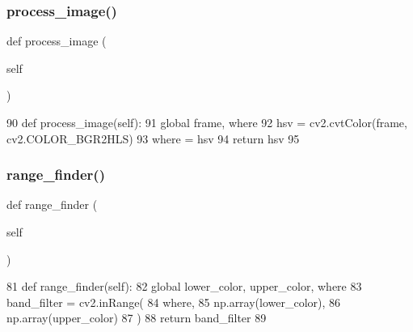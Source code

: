 \subsubsection{\texorpdfstring{process\+\_\+image()}{process\_image()}}
{\footnotesize\ttfamily def process\+\_\+image (\begin{DoxyParamCaption}\item[{}]{self }\end{DoxyParamCaption})}


\begin{DoxyCode}
90   \textcolor{keyword}{def }process\_image(self):
91       \textcolor{keyword}{global} frame, where
92       hsv = cv2.cvtColor(frame, cv2.COLOR\_BGR2HLS)
93       where = hsv
94       \textcolor{keywordflow}{return} hsv
95   
\end{DoxyCode}
\mbox{\label{classtoxic__vision_1_1lane__detector_1_1ImageSubscriber_a876735be946e8770790a53a398cbab17}} 
\subsubsection{\texorpdfstring{range\+\_\+finder()}{range\_finder()}}
{\footnotesize\ttfamily def range\+\_\+finder (\begin{DoxyParamCaption}\item[{}]{self }\end{DoxyParamCaption})}


\begin{DoxyCode}
81   \textcolor{keyword}{def }range\_finder(self):
82     \textcolor{keyword}{global} lower\_color, upper\_color, where
83     band\_filter = cv2.inRange(
84                 where,
85             np.array(lower\_color),
86             np.array(upper\_color)
87         )
88     \textcolor{keywordflow}{return} band\_filter
89 
\end{DoxyCode}
\mbox{\label{classtoxic__vision_1_1lane__detector_1_1ImageSubscriber_aa29031ea99aa06784e3755c54ba91edd}} 

